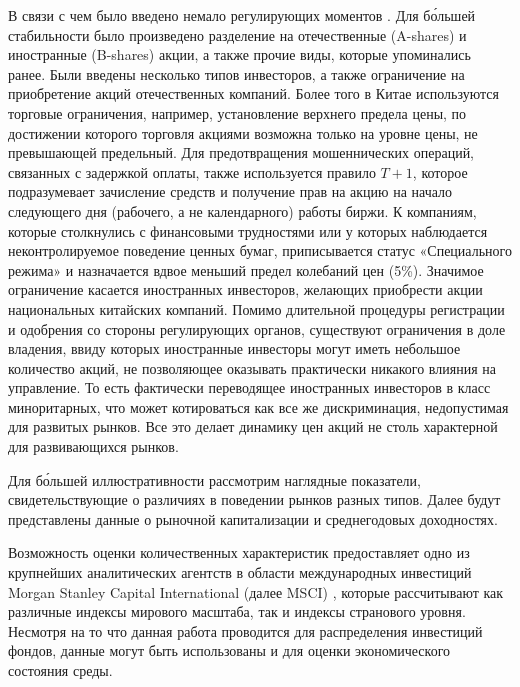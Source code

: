 В связи с чем было введено немало регулирующих моментов \cite{hu2018chinese}. Для б\'{о}льшей стабильности было произведено разделение на отечественные (A-shares) и иностранные (B-shares) акции, а также прочие виды, которые упоминались ранее. Были введены несколько типов инвесторов, а также ограничение на приобретение акций отечественных компаний. Более того в Китае используются торговые ограничения, например, установление верхнего предела цены, по достижении которого торговля акциями возможна только на уровне цены, не превышающей предельный. Для предотвращения мошеннических операций, связанных с задержкой оплаты, также используется правило $T+1$, которое подразумевает зачисление средств и получение прав на акцию на начало следующего дня (рабочего, а не календарного) работы биржи. К компаниям, которые столкнулись с финансовыми трудностями или у которых наблюдается неконтролируемое поведение ценных бумаг, приписывается статус «Специального режима» и назначается вдвое меньший предел колебаний цен (5\%). Значимое ограничение касается иностранных инвесторов, желающих приобрести акции национальных китайских компаний. Помимо длительной процедуры регистрации и одобрения со стороны регулирующих органов, существуют ограничения в доле владения, ввиду которых иностранные инвесторы могут иметь небольшое количество акций, не позволяющее оказывать практически никакого влияния на управление. То есть фактически переводящее иностранных инвесторов в класс миноритарных, что может котироваться как все же дискриминация, недопустимая для развитых рынков.  Все это делает динамику цен акций не столь характерной для развивающихся рынков. 

Для б\'{о}льшей иллюстративности рассмотрим наглядные показатели, свидетельствующие о различиях в поведении рынков разных типов. Далее будут представлены данные о рыночной капитализации и среднегодовых доходностях.

Возможность оценки количественных характеристик предоставляет одно из крупнейших аналитических агентств в области международных инвестиций Morgan Stanley Capital International (далее MSCI) \cite{open2023family}, которые рассчитывают как различные индексы мирового масштаба, так и индексы странового уровня. Несмотря на то что данная работа проводится для распределения инвестиций фондов, данные могут быть использованы и для оценки экономического состояния среды.

